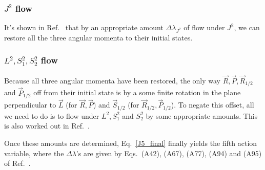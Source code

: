 \subsubsection{$J^2$ flow}

It's shown in Ref.~\cite{tanay2021action} that by an appropriate amount
$\Delta \lambda_{J^2}$ of flow under $J^2$, we can restore all the three angular momenta to their initial states.


\subsubsection{$L^2, S_1^2, S_2^2$ flow}

Because all three angular momenta have been restored, the only
way $\vec{R}, \vec{P}, \vec{R}_{1/2}$ and $\vec{P}_{1/2}$ off from their 
initial state is by a some finite rotation in the plane perpendicular
to $\vec{L}$ (for $\vec{R}, \vec{P}$) 
and $\vec{S}_{1/2}$ (for $\vec{R}_{1/2}, \vec{P}_{1/2}$). To negate this offset,
all we need to do is to flow under $L^2, S_1^2$ and $S_2^2$ by some
appropriate amounts. This is also worked out in Ref.~\cite{tanay2021action}.






Once these amounts are determined, Eq.~\eqref{J5_final}
finally yields the fifth action variable, where the $\Delta \lambda$'s are 
given by Eqs.~(A42), (A67), (A77), (A94) and (A95) of Ref.~\cite{tanay2021action}.





















